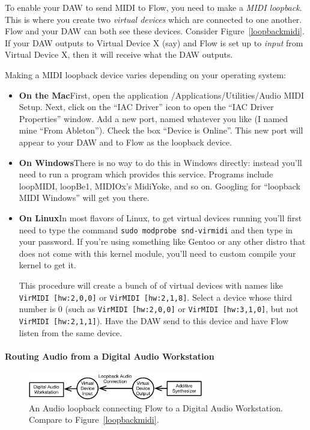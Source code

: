 \documentclass{article}
\newcommand\name{Flow}
\begin{document}
To enable your DAW to send MIDI to Flow, you need to make a {\it MIDI loopback}.  This is where you create two {\it virtual devices} which are connected to one another.  {\name} and your DAW can both see these devices.  Consider Figure~\ref{loopbackmidi}.  If your DAW outputs to Virtual Device X (say) and {\name} is set up to {\it input} from Virtual Device X, then it will receive what the DAW outputs.

Making a MIDI loopback device varies depending on your operating system:

\begin{itemize}
\item {\bf On the Mac}\quad First, open the application \textsf{/Applications/Utilities/Audio MIDI Setup}.  Next, click on the ``IAC Driver'' icon to open the ``IAC Driver Properties'' window.  Add a new port, named whatever you like (I named mine ``From Ableton'').  Check the box ``Device is Online''.  This new port will appear to your DAW and to {\name} as the loopback device.

\item {\bf On Windows}\quad There is no way to do this in Windows directly: instead you'll need to run a program which provides this service.  Programs include {\sf loopMIDI},  {\sf loopBe1}, MIDIOx's {\sf MidiYoke}, and so on.  Googling for ``loopback MIDI Windows'' will get you there. 

\item {\bf On Linux}\quad In most flavors of Linux, to get virtual devices running you'll first need to type the command \hbox{\tt sudo modprobe snd-virmidi} and then type in your password.  \quad If you're using something like Gentoo or any other distro that does not come with this kernel module, you'll need to custom compile your kernel to get it. 

This procedure will create a bunch of of virtual devices with names like {\tt VirMIDI [hw:2,0,0]} or {\tt VirMIDI [hw:2,1,8]}.  Select a device whose third number is 0 (such as {\tt VirMIDI [hw:2,0,0]} or {\tt VirMIDI [hw:3,1,0]}, but not {\tt VirMIDI [hw:2,1,1]}).  Have the DAW send to this device and have {\name} listen from the same device.
\end{itemize}

\paragraph{Routing Audio from a Digital Audio Workstation}

\begin{figure}
\begin{center}\vspace{-2em}\includegraphics[width=3in]{loopbackaudio}\end{center}
\vspace{-1em}
\caption{An Audio loopback connecting {\name} to a Digital Audio Workstation.  Compare to Figure~\ref{loopbackmidi}.}\label{loopbackaudio}
\end{figure}
\end{document}
